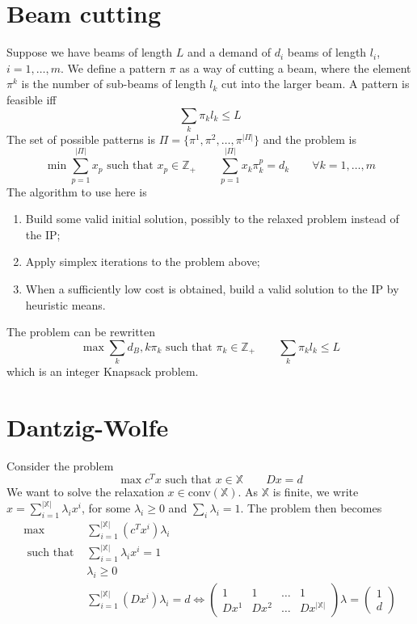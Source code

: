 \documentclass[11pt, openany]{report}
\theoremstyle{definition}
\begin{document}
\section{Beam cutting}
Suppose we have beams of length $L$ and a demand of $d_i$ beams of length $l_i$, $i=1,\dots,m$. We define a pattern $\pi$ as a way of cutting a beam, where the element $\pi^k$ is the number of sub-beams of length $l_k$ cut into the larger beam. A pattern is feasible iff
\begin{equation}
    \sum_k \pi_k l_k \le L 
\end{equation}
The set of possible patterns is $\Pi = \{\pi^1,\pi^2,\dots, \pi^{|\Pi|}\}$ and the problem is
\begin{equation}
    \min \sum_{p=1}^{|\Pi|} x_p \text{ such that } x_p \in \mathbb{Z}_+ \qquad \sum_{p=1}^{|\Pi|}x_k \pi_k^p = d_k \qquad \forall k=1,\dots,m
\end{equation}
The algorithm to use here is 
\begin{enumerate}
    \item Build some valid initial solution, possibly to the relaxed problem instead of the IP;
    \item Apply simplex iterations to the problem above;
    \item When a sufficiently low cost is obtained, build a valid solution to the IP by heuristic means. 
\end{enumerate}
The problem can be rewritten 
\begin{equation}
    \max \sum_{k} d_B,k \pi_k \text{ such that } \pi_k \in \mathbb{Z}_+ \qquad \sum_k \pi_k l_k \le L
\end{equation}
which is an integer Knapsack problem.
\section{Dantzig-Wolfe}
Consider the problem 
\begin{equation}
    \max c^Tx \text{ such that } x\in \mathbb{X}\qquad Dx=d
\end{equation}
We want to solve the relaxation $x\in$conv$(\mathbb{X})$. As $\mathbb{X}$ is finite, we write $x = \sum_{i=1}^|\mathbb{X}| \lambda_i x^i$, for some $\lambda_i\ge0$ and $\sum_i \lambda_i = 1$. The problem then becomes
\begin{equation}
    \begin{aligned}
        \max &\sum_{i=1}^{|\mathbb{X}|} (c^Tx^i)\lambda_i \\
        \text{ such that }&\sum_{i=1}^{|\mathbb{X}|} \lambda_i x^i = 1 \\
        &\lambda_i \ge 0\\
        &\sum_{i=1}^{|\mathbb{X}|} (Dx^i)\lambda_i = d\Longleftrightarrow \begin{pmatrix}
            1 & 1 & \dots & 1\\
            Dx^1 & Dx^2 & \dots & Dx^{|\mathbb{X}|} 
        \end{pmatrix} \lambda = \begin{pmatrix}
            1 \\d
        \end{pmatrix}\\ 
    \end{aligned}
\end{equation}
\end{document}
